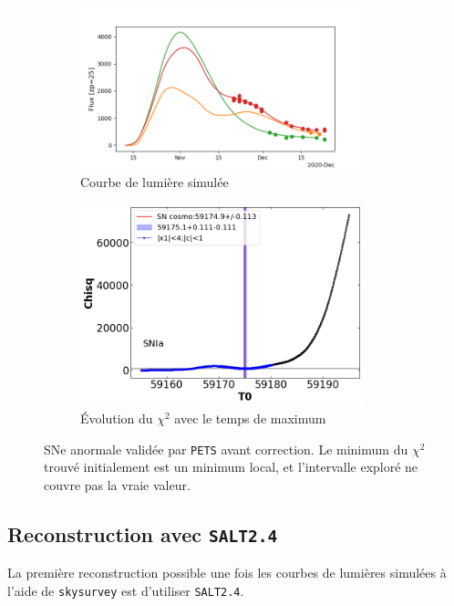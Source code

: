 \documentclass{book}
\def\skysurvey{\texttt{skysurvey}\xspace}
\def\pets{\texttt{PETS}\xspace}
\def\saltd{\texttt{SALT2.4}\xspace}
\begin{document}
\begin{figure}
	\begin{subfigure}{0.45\textwidth}
		\centering
		\includegraphics[width=0.9\textwidth]{figures/544_lc_truth.png}
		\caption{Courbe de lumière simulée}
	\end{subfigure}
	\hfill
	\begin{subfigure}{0.45\textwidth}
		\centering
		\includegraphics[width=0.9\textwidth]{figures/544_Tmaxgrid.png}
		\caption{Évolution du $\chi^2$ avec le temps de maximum}
	\end{subfigure}
	\caption{SNe anormale validée par \pets avant correction. Le minimum du $\chi^2$ trouvé initialement est un minimum local, et l'intervalle exploré ne couvre pas la vraie valeur. }
	\label{fig:pets_worst}
\end{figure}

\subsection{Reconstruction avec \saltd}

La première reconstruction possible une fois les courbes de lumières simulées à l'aide de \skysurvey est d'utiliser \saltd. 
\end{document}
